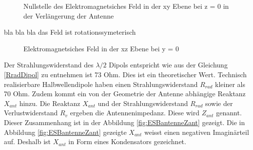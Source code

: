 \begin{figure}[!ht]%
	\begin{center}
	\end{center}
\caption{Nullstelle des Elektromagnetsiches Feld in der xy Ebene bei z = 0 in der Verlängerung der Antenne}
\label{fig:ESBantenne}
\end{figure}
 bla bla bla das Feld ist rotationssymeterisch
\begin{figure}[!ht]%
	\begin{center}
	\end{center}
\caption{Elektromagnetsiches Feld in der xz Ebene bei y = 0 }
\label{fig:ESBantenne}
\end{figure}

Der Strahlungswiderstand des $\lambda/2$ Dipols entspricht wie aus der Gleichung \ref{RradDipol} zu entnehmen ist 73 Ohm. Dies ist ein theoretischer Wert. Technisch realisierbare Halbwellendipole haben einen Strahlungswiderstand $R_{rad}$ kleiner als 70 Ohm. Zudem kommt  ein von der  Geometrie der Antenne abhängige Reaktanz $X_{ant}$ hinzu.
Die Reaktanz $X_{ant}$ und der Strahlungswiderstand $R_{rad}$ sowie der Verlustwiderstand $R_v$ ergeben die Antennenimpedanz. Diese wird $Z_{ant}$  genannt. Dieser Zusammenhang ist  in der Abbildung \ref{fig:ESBantenneZant} gezeigt. Die in Abbildung \ref{fig:ESBantenneZant} gezeigte $X_{ant}$ weisst einen negativen Imaginärteil auf. Deshalb ist $X_{ant}$ in Form eines Kondensators gezeichnet.

